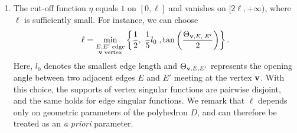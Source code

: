 ﻿\documentclass[11pt,reqno,oneside]{amsart}
\theoremstyle{definition}
\theoremstyle{remark}
\renewcommand{\S}{\mathbb{S}}
\renewcommand{\Re}{{\rm Re}}
\newcommand{\g}{\gamma}
\newcommand{\vf}{\varphi}
\newcommand{\lm}{\lambda}
\newcommand{\p}{\partial}
\renewcommand{\O}{\Omega}
\begin{document}
\begin{enumerate}
\begin{itemize}
            \item The behavior of $\g_{E,\mu}^m$ near vertices is influenced by vertex singularities, we will discuss later in ``8.) interaction between vertex and edge singularities''.
            \item The operator $\mathcal{K}$ is defined by convolution with a Schwartz kernel. It acts as a lifting operator from the edge $E$ to its cylindrical neighborhood. For any fixed $\tilde{r}\neq 0$, the map $z\mapsto \mathcal{K}[\g](\tilde{r},z)$ is smooth on $E$. For any fixed $z\in E$, $\mathcal{K}[\g](\tilde{r},z)$ converges to $\g$ as $\tilde{r}\rightarrow 0$.
            \item Remarks analogous to those for the vertex coefficients $\g_{{\bf v},\lm}^m$ apply to the computation and estimates of $\g_{E,\mu}^m$. In particular, one has \cite{Costabel1993i},
            \begin{align}\label{eq:esti-edge-coef}
                \|\g_{E,\mu}^m\|_{V_{-s}^{s-\Re(\mu)}(E)}\leq C \|f\|_{H^{1/2}(\p\O)}\lesssim 1.
            \end{align}
            \item The same remarks on $\log$ terms as in the vertex case apply here. We will also impose a generic condition $K_{E,\mu}=0$ for the edge singular exponents $\mu$ under consideration.
            \item $\vf_{E,\mu}^m\in H^1(\S^1)$ is harmonic in each subinterval and satisfies the same transmission condition across the interfaces.
            \item For a more detailed description of edge singular functions, we refer to .
        \end{itemize}
        \item The cut-off function $\eta$ equals $1$ on $[0,\ell]$ and vanishes on $[2\ell,+\infty)$, where $\ell$ is sufficiently small. For instance, we can choose
        \begin{align}\label{eq:cutoff-support}
            \ell=\min_{\begin{subarray}{c} E,E'\; {\rm edge}\\ {\bf v}\; {\rm vertex} \end{subarray}}   \left\lbrace \frac{1}{2},\; \frac{1}{5}l_0\;, \tan \left(\frac{\Theta_{{\bf v},E,\;E'}}{2}\right) \right\rbrace.
        \end{align}
        Here, $l_0$ denotes the smallest edge length and $\Theta_{{\bf v},E,E'}$ represents the opening angle between two adjacent edges $E$ and $E'$ meeting at the vertex ${\bf v}$. With this choice, the supports of vertex singular functions are pairwise disjoint, and the same holds for edge singular functions. We remark that $\ell$ depends only on geometric parameters of the polyhedron $D$, and can therefore be treated as an {\it a priori} parameter.

\end{enumerate}
\end{document}
